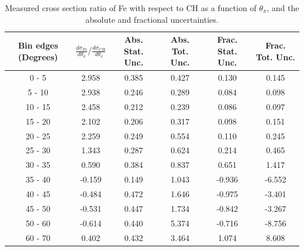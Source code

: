 \documentclass[aps,prl,twocolumn,superscriptaddress,nofootinbib]{revtex4-1}
\begin{document}
\begin{table}[h!]
  \centering
  \caption{Measured cross section ratio of Fe with respect to CH as a function
  of $\theta_{\pi}$,  and the absolute and fractional uncertainties.}
    \begin{tabular}{c||c||c|c||c|c}
      Bin edges (Degrees) & $\frac{d\sigma_{Fe}}{d\theta_{\pi}}/\frac{d\sigma_{CH}}{d\theta_{\pi}}$ & Abs. Stat. Unc. & Abs. Tot. Unc. & Frac. Stat. Unc. & Frac. Tot. Unc. \\
      \hline\hline
        0 - 5 & 2.958 & 0.385 & 0.427 & 0.130 & 0.145 \\
       5 - 10 & 2.938 & 0.246 & 0.289 & 0.084 & 0.098 \\
      10 - 15 & 2.458 & 0.212 & 0.239 & 0.086 & 0.097 \\
      15 - 20 & 2.102 & 0.206 & 0.317 & 0.098 & 0.151 \\
      20 - 25 & 2.259 & 0.249 & 0.554 & 0.110 & 0.245 \\
      25 - 30 & 1.343 & 0.287 & 0.624 & 0.214 & 0.465 \\
      30 - 35 & 0.590 & 0.384 & 0.837 & 0.651 & 1.417 \\
      35 - 40 & -0.159 & 0.149 & 1.043 & -0.936 & -6.552 \\
      40 - 45 & -0.484 & 0.472 & 1.646 & -0.975 & -3.401 \\
      45 - 50 & -0.531 & 0.447 & 1.734 & -0.842 & -3.267 \\
      50 - 60 & -0.614 & 0.440 & 5.374 & -0.716 & -8.756 \\
      60 - 70 & 0.402 & 0.432 & 3.464 & 1.074 & 8.608 \\
    \end{tabular}
  \label{table:ThetaPiXSecRatio_Fe}
\end{table}
\end{document}
